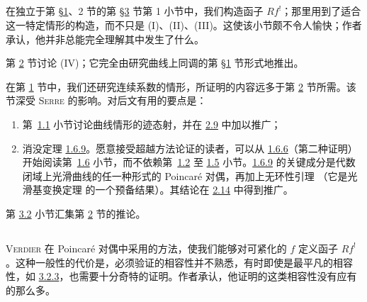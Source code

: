 \subsection{}
在独立于第 \hyperref[XVIII.sec1]{\S 1}、2 节的第 \hyperref[XVIII.sec3]{\S 3} 节第 1 小节中，我们构造函子 $Rf^{!}$；那里用到了适合这一特定情形的构造，而不只是 (I)、(II)、(III)。这使该小节颇不令人愉快；作者承认，他并非总能完全理解其中发生了什么。

第 \hyperref[XVIII.sec2]{2} 节讨论 (IV)；它完全由\pageoriginale{}研究曲线上同调的第 \hyperref[XVIII.sec1]{\S 1} 节形式地推出。

在第 \hyperref[XVIII.sec1]{1} 节中，我们还研究连续系数的情形，所证明的内容远多于第 \hyperref[XVIII.sec2]{2} 节所需。该节深受 \textsc{Serre} \cite{sga4.exp.XVIII.bib.6} 的影响。对后文有用的要点是：
\begin{enumerate}
\renewcommand{\theenumi}{\alph{enumi}}
\renewcommand{\labelenumi}{\theenumi)}
\item 第~\hyperref[XVIII.subsec1.1]{1.1} 小节讨论曲线情形的迹态射，并在 \hyperref[XVIII.thm2.9]{2.9} 中加以推广；

\item 消没定理 \hyperref[XVIII.lemfond1.6.9]{1.6.9}。愿意接受超越方法论证的读者，可以从 \hyperref[XVIII.lem1.6.6]{1.6.6}（第二种证明）开始阅读第~\hyperref[XVIII.subsec1.6]{1.6} 小节，而不依赖第~\hyperref[XVIII.subsec1.2]{1.2} 至 \hyperref[XVIII.subsec1.5]{1.5} 小节。\hyperref[XVIII.lemfond1.6.9]{1.6.9} 的关键成分是代数闭域上光滑曲线的任一种形式的 Poincaré 对偶，再加上无环性引理 （它是光滑基变换定理  的一个预备结果）。其结论在 \hyperref[XVIII.thm2.14]{2.14} 中得到推广。
\end{enumerate}

第 \hyperref[XVIII.subsec3.2]{3.2} 小节汇集第 \hyperref[XVIII.sec2]{2} 节的推论。

\subsection{}
\textsc{Verdier} 在 Poincaré 对偶中采用的方法，使我们能够对可紧化的 $f$ 定义函子 $Rf^{!}$。这种一般性的代价是，必须验证的相容性并不熟悉，有时即使是最平凡的相容性，如 \hyperref[XVIII.lem3.2.3]{3.2.3}，也需要十分奇特的证明。作者承认，他证明的这类相容性没有应有的那么多。


